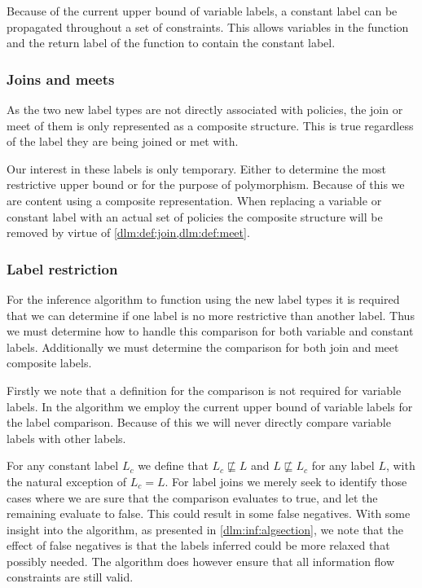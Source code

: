 Because of the current upper bound of variable labels, a constant label can be propagated throughout a set of constraints.
This allows variables in the function and the return label of the function to contain the constant label.

\subsubsection{Joins and meets}
As the two new label types are not directly associated with policies, the join or meet of them is only represented as a composite structure.
This is true regardless of the label they are being joined or met with.

Our interest in these labels is only temporary.
Either to determine the most restrictive upper bound or for the purpose of polymorphism.
Because of this we are content using a composite representation.
When replacing a variable or constant label with an actual set of policies the composite structure will be removed by virtue of \cref{dlm:def:join,dlm:def:meet}.

\subsubsection{Label restriction}
For the inference algorithm to function using the new label types it is required that we can determine if one label is no more restrictive than another label.
Thus we must determine how to handle this comparison for both variable and constant labels.
Additionally we must determine the comparison for both join and meet composite labels.

Firstly we note that a definition for the comparison is not required for variable labels.
In the algorithm we employ the current upper bound of variable labels for the label comparison.
Because of this we will never directly compare variable labels with other labels.

For any constant label $L_c$ we define that $L_c \not \sqsubseteq L$ and $L \not \sqsubseteq L_c$ for any label $L$, with the natural exception of $L_c = L$.
For label joins we merely seek to identify those cases where we are sure that the comparison evaluates to true, and let the remaining evaluate to false.
This could result in some false negatives.
With some insight into the algorithm, as presented in \cref{dlm:inf:algsection}, we note that the effect of false negatives is that the labels inferred could be more relaxed that possibly needed.
The algorithm does however ensure that all information flow constraints are still valid.

